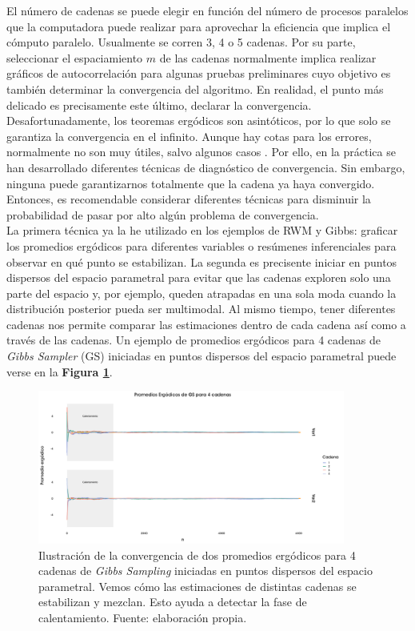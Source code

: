 El número de cadenas se puede elegir en función del número de procesos paralelos que la computadora puede realizar para aprovechar la eficiencia que implica el cómputo paralelo. Usualmente se corren 3, 4 o 5 cadenas. Por su parte, seleccionar el espaciamiento $m$ de las cadenas normalmente implica realizar gráficos de autocorrelación para algunas pruebas preliminares cuyo objetivo es también determinar la convergencia del algoritmo. En realidad, el punto más delicado es precisamente este último, declarar la convergencia.\\ 

Desafortunadamente, los teoremas ergódicos son asintóticos, por lo que solo se garantiza la convergencia en el infinito. Aunque hay cotas para los errores, normalmente no son muy útiles, salvo algunos casos \parencite{SmithRoberts93}. Por ello, en la práctica se han desarrollado diferentes técnicas de diagnóstico de convergencia. Sin embargo, ninguna puede garantizarnos totalmente que la cadena ya haya convergido. Entonces, es recomendable considerar diferentes técnicas para disminuir la probabilidad de pasar por alto algún problema de convergencia.\\

La primera técnica ya la he utilizado en los ejemplos de RWM y Gibbs: graficar los promedios ergódicos para diferentes variables o resúmenes inferenciales para observar en qué punto se estabilizan. La segunda es precisente iniciar en puntos dispersos del espacio parametral para evitar que las cadenas exploren solo una parte del espacio y, por ejemplo, queden atrapadas en una sola moda cuando la distribución posterior pueda ser multimodal. Al mismo tiempo, tener diferentes cadenas nos permite comparar las estimaciones dentro de cada cadena así como a través de las cadenas. Un ejemplo de promedios ergódicos para 4 cadenas de \textit{Gibbs Sampler} (GS) iniciadas en puntos dispersos del espacio parametral puede verse en la \textbf{Figura \ref{fig:Conv_Prom_Erg}}.\\ 

\begin{figure}[h]
	\centering
	\includegraphics[width=0.9\textwidth]{Figs/Bayes/Ejemplos_Convergencia_Prom_Erg}
	\caption{Ilustración de la convergencia de dos promedios ergódicos para 4 cadenas de \textit{Gibbs Sampling} iniciadas en puntos dispersos del espacio parametral. Vemos cómo las estimaciones de distintas cadenas se estabilizan y mezclan. Esto ayuda a detectar la fase de calentamiento. Fuente: elaboración propia.}
	\label{fig:Conv_Prom_Erg}	
\end{figure}

